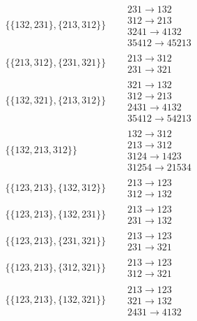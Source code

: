 \begin{tiny}
\begin{align}
\begin{matrix}
\end{matrix}
\\
\{\{132, 231\}, \{213, 312\}\}
\quad
&
\begin{matrix}
231 \to 132\\312 \to 213\\3241 \to 4132\\35412 \to 45213
\end{matrix}
\\
\{\{213, 312\}, \{231, 321\}\}
\quad
&
\begin{matrix}
213 \to 312\\231 \to 321
\end{matrix}
\\
\{\{132, 321\}, \{213, 312\}\}
\quad
&
\begin{matrix}
321 \to 132\\312 \to 213\\2431 \to 4132\\35412 \to 54213
\end{matrix}
\\
\{\{132, 213, 312\}\}
\quad
&
\begin{matrix}
132 \to 312\\213 \to 312\\3124 \to 1423\\31254 \to 21534
\end{matrix}
\\
\{\{123, 213\}, \{132, 312\}\}
\quad
&
\begin{matrix}
213 \to 123\\312 \to 132
\end{matrix}
\\
\{\{123, 213\}, \{132, 231\}\}
\quad
&
\begin{matrix}
213 \to 123\\231 \to 132
\end{matrix}
\\
\{\{123, 213\}, \{231, 321\}\}
\quad
&
\begin{matrix}
213 \to 123\\231 \to 321
\end{matrix}
\\
\{\{123, 213\}, \{312, 321\}\}
\quad
&
\begin{matrix}
213 \to 123\\312 \to 321
\end{matrix}
\\
\{\{123, 213\}, \{132, 321\}\}
\quad
&
\begin{matrix}
213 \to 123\\321 \to 132\\2431 \to 4132

\end{matrix}
\end{align}
\end{tiny}

